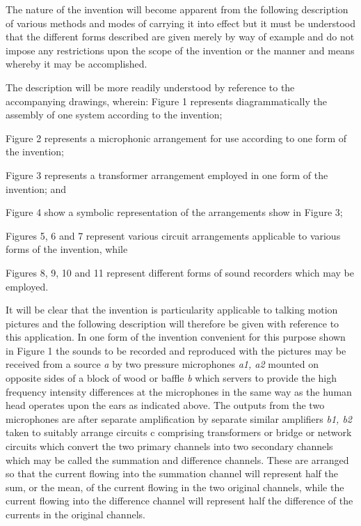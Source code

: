 \documentclass[11pt]{article}
\begin{document}
\begin{multicols*}{2}
The nature of the invention will become apparent from the following description of various methods and modes of carrying it into effect but it must be understood that the different forms described are given merely by way of example and do not impose any restrictions upon the scope of the invention or the manner and means whereby it may be accomplished.

The description will be more readily understood by reference to the accompanying drawings, wherein:
Figure 1 represents diagrammatically the assembly of one system according to the invention;

Figure 2 represents a microphonic arrangement for use according to one form of the invention;

Figure 3 represents a transformer arrangement employed in one form of the invention; and

Figure 4 show a symbolic representation of the arrangements show in Figure 3;

Figures 5, 6 and 7 represent various circuit arrangements applicable to various forms of the invention, while

Figures 8, 9, 10 and 11 represent different forms of sound recorders which may be employed.

It will be clear that the invention is particularity applicable to talking motion pictures and the following description will therefore be given with reference to this application. In one form of the invention convenient for this purpose shown in Figure 1 the sounds to be recorded and reproduced with the pictures may be received from a source \textit{a} by two pressure microphones \textit{a1, a2} mounted on opposite sides of a block of wood or baffle \textit{b} which servers to provide the high frequency intensity differences at the microphones in the same way as the human head operates upon the ears as indicated above. The outputs from the two microphones are after separate amplification by separate similar amplifiers \textit{b1, b2} taken to suitably arrange circuits c comprising transformers or bridge or network circuits which convert the two primary channels into two secondary channels which may be called the summation and difference channels. These are arranged so that the current flowing into the summation channel will represent half the sum, or the mean, of the current flowing in the two original channels, while the current flowing into the difference channel will represent half the difference of the currents in the original channels.
	

\end{multicols*}
\end{document}
